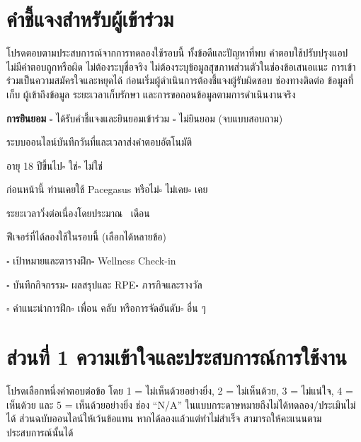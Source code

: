 \section*{คำชี้แจงสำหรับผู้เข้าร่วม}

โปรดตอบตามประสบการณ์จากการทดลองใช้รอบนี้ ทั้งข้อดีและปัญหาที่พบ คำตอบใช้ปรับปรุงแอป ไม่มีคำตอบถูกหรือผิด ไม่ต้องระบุชื่อจริง ไม่ต้องระบุข้อมูลสุขภาพส่วนตัวในช่องข้อเสนอแนะ การเข้าร่วมเป็นความสมัครใจและหยุดได้ ก่อนเริ่มผู้ดำเนินการต้องชี้แจงผู้รับผิดชอบ ช่องทางติดต่อ ข้อมูลที่เก็บ ผู้เข้าถึงข้อมูล ระยะเวลาเก็บรักษา และการขอถอนข้อมูลตามการดำเนินงานจริง

\noindent\textbf{การยินยอม}\quad
$\square$ ได้รับคำชี้แจงและยินยอมเข้าร่วม\quad
$\square$ ไม่ยินยอม (จบแบบสอบถาม)

\medskip
\noindent ระบบออนไลน์บันทึกวันที่และเวลาส่งคำตอบอัตโนมัติ

\noindent อายุ 18 ปีขึ้นไป\quad $\square$ ใช่\quad $\square$ ไม่ใช่

\noindent ก่อนหน้านี้ ท่านเคยใช้ Pacegasus หรือไม่\quad $\square$ ไม่เคย\quad $\square$ เคย

\noindent ระยะเวลาวิ่งต่อเนื่องโดยประมาณ \dotfill\ เดือน

\noindent ฟีเจอร์ที่ได้ลองใช้ในรอบนี้ (เลือกได้หลายข้อ)

\noindent $\square$ เป้าหมายและตารางฝึก\quad $\square$ Wellness Check-in

\noindent $\square$ บันทึกกิจกรรม\quad $\square$ ผลสรุปและ RPE\quad $\square$ ภารกิจและรางวัล

\noindent $\square$ คำแนะนำการฝึก\quad $\square$ เพื่อน คลับ หรือการจัดอันดับ\quad $\square$ อื่น ๆ \dotfill

\section*{ส่วนที่ 1 ความเข้าใจและประสบการณ์การใช้งาน}

โปรดเลือกหนึ่งคำตอบต่อข้อ โดย 1 = ไม่เห็นด้วยอย่างยิ่ง, 2 = ไม่เห็นด้วย, 3 = ไม่แน่ใจ, 4 = เห็นด้วย และ 5 = เห็นด้วยอย่างยิ่ง ช่อง ``N/A'' ในแบบกระดาษหมายถึงไม่ได้ทดลอง/ประเมินไม่ได้ ส่วนฉบับออนไลน์ให้เว้นข้อแทน หากได้ลองแล้วแต่ทำไม่สำเร็จ สามารถให้คะแนนตามประสบการณ์นั้นได้


